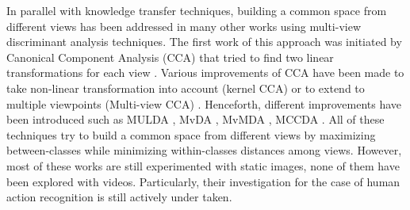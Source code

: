 
        In parallel with knowledge transfer techniques, building a common space from different views has been addressed in many other works using multi-view discriminant analysis techniques.
        The first work of this approach was initiated by Canonical Component Analysis (CCA) that tried to find two linear transformations for each view \cite{thompson1984canonical}.
        Various improvements of CCA have been made to take non-linear transformation into account (kernel CCA) or to extend to multiple viewpoints (Multi-view CCA) \cite{hardoon2004canonical}. %
        Henceforth, different improvements have been introduced such as MULDA \cite{yang2014multi}, MvDA \cite{kan2015multi}, MvMDA \cite{you2019multi}, MCCDA \cite{you2019multi}.
        All of these techniques try to build a common space from different views by maximizing between-classes while minimizing within-classes distances among views.
        However, most of these works are still experimented with static images, none of them have been explored with videos.
        Particularly, their investigation for the case of human action recognition is still actively under taken.

